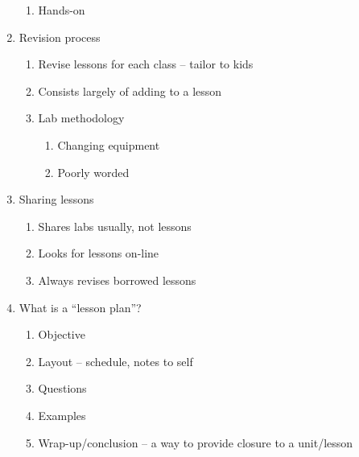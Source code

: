 \begin{enumerate}
\begin{enumerate}
			\item Hands-on
		\end{enumerate}

	\item Revision process
		\begin{enumerate}
			\item Revise lessons for each class -- tailor to kids

			\item Consists largely of adding to a lesson

			\item Lab methodology
				\begin{enumerate}
					\item Changing equipment

					\item Poorly worded
				\end{enumerate}

		\end{enumerate}

	\item Sharing lessons
		\begin{enumerate}
			\item Shares labs usually, not lessons

			\item Looks for lessons on-line

			\item Always revises borrowed lessons

		\end{enumerate}

	\item What is a ``lesson plan''?
		\begin{enumerate}
			\item Objective

			\item Layout -- schedule, notes to self

			\item Questions

			\item Examples

			\item Wrap-up/conclusion -- a way to provide closure to a
				unit/lesson

		\end{enumerate}

\end{enumerate}

